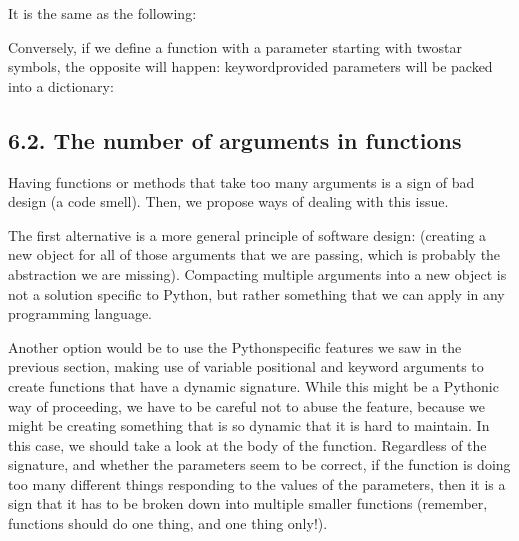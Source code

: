 \documentclass[a4paper,10pt,english]{sphinxmanual}
\begin{document}
It is the same as the following:

\begin{sphinxVerbatim}[commandchars=\\\{\}]
\end{sphinxVerbatim}

Conversely, if we define a function with a parameter starting with two\sphinxhyphen{}star symbols, the opposite will happen:
keyword\sphinxhyphen{}provided parameters will be packed into a dictionary:

\begin{sphinxVerbatim}[commandchars=\\\{\}]
 
    
\end{sphinxVerbatim}


\subsection{6.2. The number of arguments in functions}
\label{\detokenize{chapters/3_general_traits/index:the-number-of-arguments-in-functions}}
Having functions or methods that take too many arguments is a sign of bad design (a code smell). Then, we
propose ways of dealing with this issue.

The first alternative is a more general principle of software design:  (creating a new object
for all of those arguments that we are passing, which is probably the abstraction we are missing). Compacting
multiple arguments into a new object is not a solution specific to Python, but rather something that we can
apply in any programming language.

Another option would be to use the Python\sphinxhyphen{}specific features we saw in the previous section, making use of
variable positional and keyword arguments to create functions that have a dynamic signature. While this might
be a Pythonic way of proceeding, we have to be careful not to abuse the feature, because we might be creating
something that is so dynamic that it is hard to maintain. In this case, we should take a look at the body of
the function. Regardless of the signature, and whether the parameters seem to be correct, if the function is
doing too many different things responding to the values of the parameters, then it is a sign that it has to
be broken down into multiple smaller functions (remember, functions should do one thing, and one thing only!).
\end{document}
